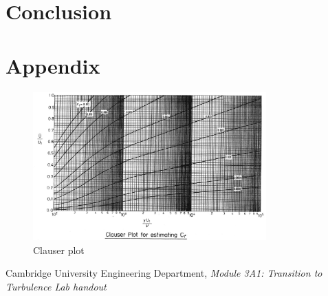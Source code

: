 \documentclass{article}
\begin{document}


\section{Conclusion}



\section{Appendix}

\begin{figure}[H]
    \centering
    \includegraphics[width=0.8\textwidth]{clauser.jpg}
    \caption{Clauser plot}
    \label{fig:clauser}
\end{figure}

\begin{thebibliography}{9}
    Cambridge University Engineering Department, \textit{Module 3A1: Transition to Turbulence Lab handout}
\end{thebibliography}
\end{document}
